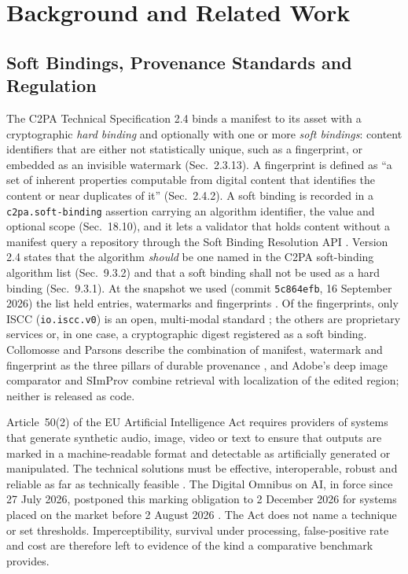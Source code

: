 \section{Background and Related Work}
\label{sec:related}

\subsection{Soft Bindings, Provenance Standards and Regulation}
The C2PA Technical Specification 2.4 \cite{c2pa2026spec} binds a manifest to its asset with a cryptographic \emph{hard binding} and optionally with one or more \emph{soft bindings}: content identifiers that are either not statistically unique, such as a fingerprint, or embedded as an invisible watermark (Sec.~2.3.13). A fingerprint is defined as ``a set of inherent properties computable from digital content that identifies the content or near duplicates of it'' (Sec.~2.4.2). A soft binding is recorded in a \texttt{c2pa.soft-binding} assertion carrying an algorithm identifier, the value and optional scope (Sec.~18.10), and it lets a validator that holds content without a manifest query a repository through the Soft Binding Resolution API \cite{c2pa2026softbindingapi}. Version 2.4 states that the algorithm \emph{should} be one named in the C2PA soft-binding algorithm list (Sec.~9.3.2) and that a soft binding shall not be used as a hard binding (Sec.~9.3.1). At the snapshot we used (commit \texttt{5c864efb}, 16 September 2026) the list held  entries,  watermarks and  fingerprints \cite{c2pasoftbindinglist}. Of the fingerprints, only ISCC (\texttt{io.iscc.v0}) is an open, multi-modal standard \cite{iso24138}; the others are proprietary services or, in one case, a cryptographic digest registered as a soft binding. Collomosse and Parsons describe the combination of manifest, watermark and fingerprint as the three pillars of durable provenance \cite{collomosse2024durable}, and Adobe's deep image comparator \cite{black2021dic} and SImProv \cite{black2022simprov} combine retrieval with localization of the edited region; neither is released as code.

Article~50(2) of the EU Artificial Intelligence Act requires providers of systems that generate synthetic audio, image, video or text to ensure that outputs are marked in a machine-readable format and detectable as artificially generated or manipulated. The technical solutions must be effective, interoperable, robust and reliable as far as technically feasible \cite{eu2024aiact}. The Digital Omnibus on AI, in force since 27 July 2026, postponed this marking obligation to 2 December 2026 for systems placed on the market before 2 August 2026 \cite{eu2026omnibus}. The Act does not name a technique or set thresholds. Imperceptibility, survival under processing, false-positive rate and cost are therefore left to evidence of the kind a comparative benchmark provides.

